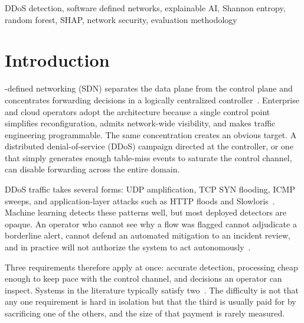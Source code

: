 \documentclass{ieeeaccess}
\begin{document}
\begin{keywords}
DDoS detection, software defined networks, explainable AI, Shannon entropy, random forest, SHAP, network security, evaluation methodology
\end{keywords}

\titlepgskip=-21pt

\maketitle

\section{Introduction}
\label{sec:intro}

-defined networking (SDN) separates the data plane from the control plane and concentrates forwarding decisions in a logically centralized controller~\cite{mckeown2008openflow,kreutz2015sdn}. Enterprise and cloud operators adopt the architecture because a single control point simplifies reconfiguration, admits network-wide visibility, and makes traffic engineering programmable. The same concentration creates an obvious target. A distributed denial-of-service (DDoS) campaign directed at the controller, or one that simply generates enough table-miss events to saturate the control channel, can disable forwarding across the entire domain.

DDoS traffic takes several forms: UDP amplification, TCP SYN flooding, ICMP sweeps, and application-layer attacks such as HTTP floods and Slowloris~\cite{mirkovic2004taxonomy,sharafaldin2019ddos,bhuyan2014network}. Machine learning detects these patterns well, but most deployed detectors are opaque. An operator who cannot see why a flow was flagged cannot adjudicate a borderline alert, cannot defend an automated mitigation to an incident review, and in practice will not authorize the system to act autonomously~\cite{arrieta2020xai,guidotti2018survey,warnecke2020evaluating,samed2025xaiids}.

Three requirements therefore apply at once: accurate detection, processing cheap enough to keep pace with the control channel, and decisions an operator can inspect. Systems in the literature typically satisfy two~\cite{mousavi2015early,jain2024ddossurvey}. The difficulty is not that any one requirement is hard in isolation but that the third is usually paid for by sacrificing one of the others, and the size of that payment is rarely measured.
\end{document}
